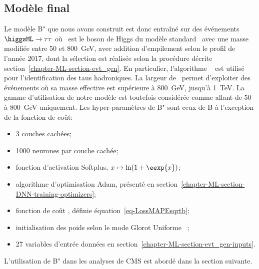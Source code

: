 \subsection{Modèle final}
Le modèle B" que nous avons construit
est donc entraîné sur des événements $\higgsML\to\tau\tau$
où \higgsML\ est le boson de Higgs du modèle standard \higgs\ avec une masse modifiée
entre \num{50} et \SI{800}{\GeV},
avec addition d'empilement selon le profil de l'année 2017,
dont la sélection est réalisée selon la procédure décrite section~\ref{chapter-ML-section-evt_gen}.
En particulier, l'algorithme \DEEPTAU~\cite{CMS-DP-2019-033} est utilisé pour l'identification des taus hadroniques.
La largeur de \higgsML\ permet d'exploiter des événements où sa masse effective est supérieure à \SI{800}{\GeV}, jusqu'à \SI{1}{\TeV}.
La gamme d'utilisation de notre modèle est toutefois considérée comme allant de \num{50} à \SI{800}{\GeV} uniquement.
Les hyper-paramètres de B" sont ceux de B à l'exception de la fonction de coût:
\begin{itemize}
\item 3 couches cachées;
\item \num{1000} neurones par couche cachée;
\item fonction d'activation Softplus, $x\mapsto\ln(1+\eexp{x})$;
\item algorithme d'optimisation Adam, présenté en section~\ref{chapter-ML-section-DNN-training-optimizers};
\item fonction de coût \LossMAPEsqrtb, définie équation~\eqref{eq-LossMAPEsqrtb};
\item initialisation des poids selon le mode \og Glorot Uniforme \fg~\cite{glorot};
\item 27 variables d'entrée données en section~\ref{chapter-ML-section-evt_gen-inputs}.
\end{itemize}
\par
L'utilisation de B" dans les analyses de CMS est abordé dans la section suivante.